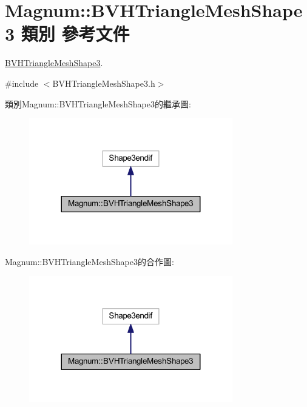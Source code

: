 \hypertarget{class_magnum_1_1_b_v_h_triangle_mesh_shape3}{}\section{Magnum\+:\+:B\+V\+H\+Triangle\+Mesh\+Shape3 類別 參考文件}
\label{class_magnum_1_1_b_v_h_triangle_mesh_shape3}


\hyperlink{class_magnum_1_1_b_v_h_triangle_mesh_shape3}{B\+V\+H\+Triangle\+Mesh\+Shape3}.  




{\ttfamily \#include $<$B\+V\+H\+Triangle\+Mesh\+Shape3.\+h$>$}



類別\+Magnum\+:\+:B\+V\+H\+Triangle\+Mesh\+Shape3的繼承圖\+:\nopagebreak
\begin{figure}[H]
\begin{center}
\leavevmode
\includegraphics[width=251pt]{class_magnum_1_1_b_v_h_triangle_mesh_shape3__inherit__graph}
\end{center}
\end{figure}


Magnum\+:\+:B\+V\+H\+Triangle\+Mesh\+Shape3的合作圖\+:\nopagebreak
\begin{figure}[H]
\begin{center}
\leavevmode
\includegraphics[width=251pt]{class_magnum_1_1_b_v_h_triangle_mesh_shape3__coll__graph}
\end{center}
\end{figure}
